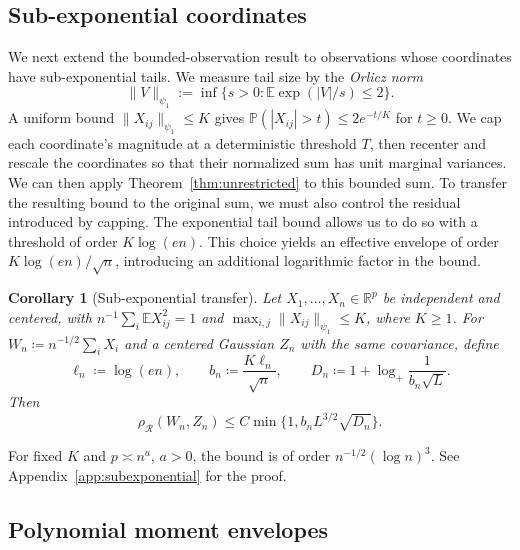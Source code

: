 \documentclass[11pt,letterpaper]{article}
\newenvironment{recovered}{}{}
\newtheorem{corollary}{Corollary}
\theoremstyle{remark}
\newcommand{\E}{\mathbb E}
\newcommand{\Pp}{\mathbb P}
\newcommand{\R}{\mathbb R}
\newcommand{\rh}{\rho_{\mathcal R}}
\begin{document}
\subsection{Sub-exponential coordinates}\label{sec:subexponential}
\begin{recovered}
We next extend the bounded-observation result to observations whose
coordinates have sub-exponential tails. We measure tail size by the
\emph{Orlicz norm}
\[
 \|V\|_{\psi_1}:=\inf\{s>0:\E\exp(|V|/s)\le2\}.
\]
A uniform bound \(\|X_{ij}\|_{\psi_1}\le K\) gives
\(\Pp(|X_{ij}|>t)\le2e^{-t/K}\) for \(t\ge0\).
We cap each coordinate's magnitude at a deterministic threshold \(T\),
then recenter and rescale the coordinates so that their normalized
sum has unit marginal variances. We can then apply
Theorem~\ref{thm:unrestricted} to this bounded sum. To transfer the
resulting bound to the original sum, we must also control the residual
introduced by capping. The exponential tail bound allows us to do so
with a threshold of order \(K\log(en)\). This choice yields an
effective envelope of order \(K\log(en)/\sqrt n\), introducing an
additional logarithmic factor in the bound.
\end{recovered}

\begin{corollary}[Sub-exponential transfer]\label{cor:subexponential}
Let \(X_1,\ldots,X_n\in\R^p\) be independent and centered, with
\(n^{-1}\sum_i\E X_{ij}^2=1\) and
\(\max_{i,j}\|X_{ij}\|_{\psi_1}\le K\), where \(K\ge1\).
For \(W_n\coloneqq n^{-1/2}\sum_iX_i\) and a centered Gaussian \(Z_n\)
with the same covariance, {define}
\[
 \ell_n\coloneqq \log(en),\qquad b_n\coloneqq \frac{K\ell_n}{\sqrt n},\qquad
 D_n\coloneqq 1+\log_+\frac1{b_n\sqrt L}.
\]
Then
\begin{equation}
 \rh(W_n,Z_n)\le C\min\{1,b_nL^{3/2}\sqrt{D_n}\}.
 \label{eq:subexponential}
\end{equation}

\end{corollary}

\begin{recovered}
For fixed \(K\) and \(p\asymp n^a\), \(a>0\), the bound is of order
\(n^{-1/2}(\log n)^3\). See Appendix~\ref{app:subexponential} for the proof.
\end{recovered}

\subsection{Polynomial moment envelopes}\label{sec:polynomial-main}
\end{document}

